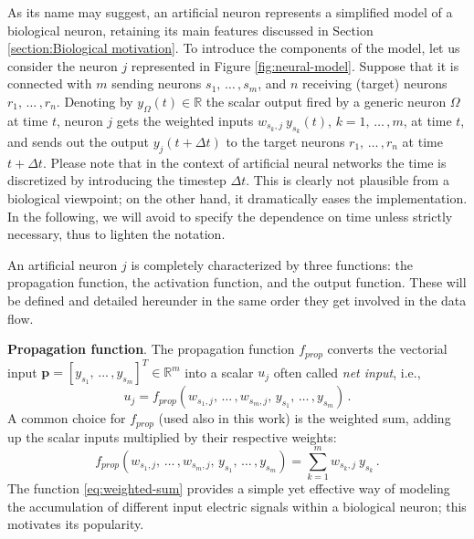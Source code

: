 \documentclass[12pt, a4paper, twoside, openright]{report}
\numberwithin{equation}{chapter}
\theoremstyle{theorem}
\theoremstyle{definition}
\theoremstyle{remark}
\theoremstyle{proposition}
\numberwithin{figure}{chapter}
\begin{document}
		As its name may suggest, an artificial neuron represents a simplified model of a biological neuron, retaining its main features discussed in Section \ref{section:Biological motivation}. To introduce the components of the model, let us consider the neuron $j$ represented in Figure \ref{fig:neural-model}. Suppose that it is connected with $m$ sending neurons $s_1, \, \ldots \, , s_m$, and $n$ receiving (target) neurons $r_1, \, \ldots \, , r_n$. Denoting by $y_{\Omega}(t) \in \mathbb{R}$ the scalar output fired by a generic neuron $\Omega$ at time $t$, neuron $j$ gets the weighted inputs $w_{s_k,j} ~ y_{s_k}(t)$, $k = 1, \, \ldots \, , m$, at time $t$, and sends out the output $y_j(t + \Delta t)$ to the target neurons $r_1, \, \ldots \, , r_n$ at time $t + \Delta t$. Please note that in the context of artificial neural networks the time is discretized by introducing the timestep $\Delta t$. This is clearly not plausible from a biological viewpoint; on the other hand, it dramatically eases the implementation. In the following, we will avoid to specify the dependence on time unless strictly necessary, thus to lighten the notation.
		
		An artificial neuron $j$ is completely characterized by three functions: the propagation function, the activation function, and the output function. These will be defined and detailed hereunder in the same order they get involved in the data flow. 
		
		\vspace*{0.3cm}
		
		\noindent \textbf{Propagation function}. The propagation function $f_{prop}$ converts the vectorial input $\mathbf{p} = [y_{s_1}, \, \ldots \, , y_{s_m}]^T \in \mathbb{R}^m$ into a scalar $u_{j}$ often called \emph{net input}, i.e.,
		\begin{equation}
			\label{eq:propagation-function}
			u_{j} = f_{prop}(w_{s_1,j}, \, \ldots \, , w_{s_m,j}, \, y_{s_1}, \, \ldots \, , y_{s_m}) \, .
		\end{equation}
		A common choice for $f_{prop}$ (used also in this work) is the weighted sum, adding up the scalar inputs multiplied by their respective weights:
		\begin{equation}
			\label{eq:weighted-sum}
			f_{prop}(w_{s_1,j}, \, \ldots \, , w_{s_m,j}, \, y_{s_1}, \, \ldots \, , y_{s_m}) = \sum_{k = 1}^m w_{s_k,j} ~ y_{s_k} \, .
		\end{equation} 
		The function \eqref{eq:weighted-sum} provides a simple yet effective way of modeling the accumulation of different input electric signals within a biological neuron; this motivates its popularity.
		
\end{document}
